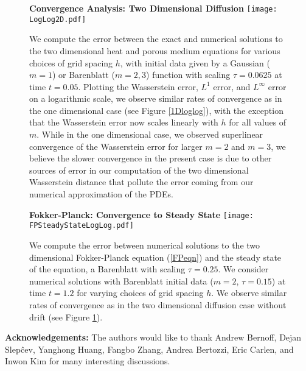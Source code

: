 \documentclass[11pt,leqno]{amsart}
\theoremstyle{definition}
\begin{document}
\begin{figure}[!ht]
\centering
\textbf{Convergence Analysis: Two Dimensional Diffusion}
\hspace*{-1.2cm}
\texttt{[image: LogLog2D.pdf]}
	\caption{We compute the error between the exact and numerical solutions to the two dimensional heat and porous medium equations  for various choices of grid spacing $h$, with initial data given by a Gaussian ($m=1$) or Barenblatt ($m=2, 3$) function with scaling $\tau = 0.0625$ at time $t = 0.05$. Plotting the Wasserstein error, $L^1$ error, and $L^\infty$ error on a logarithmic scale, we observe similar rates of convergence as in the one dimensional case (see Figure \ref{1Dloglog}), with the exception that the Wasserstein error now scales linearly with $h$ for all values of $m$. While in the one dimensional case, we observed superlinear convergence of the Wasserstein error for larger $m =2$ and $m=3$, we believe the slower convergence in the present case is due to other sources of error in our computation of the two dimensional Wasserstein distance that pollute the error coming from our numerical approximation of the PDEs. } \label{2Dloglog}
\end{figure}


\begin{figure}[!ht]
\centering
\textbf{Fokker-Planck: Convergence to Steady State}
\hspace*{-1.2cm}
\texttt{[image: FPSteadyStateLogLog.pdf]}
	\caption{We compute the error between numerical solutions to the two dimensional Fokker-Planck equation  (\ref{FPeqn}) and the steady state of the equation, a Barenblatt with scaling $\tau = 0.25$. We consider numerical solutions with Barenblatt initial data ($m=2$, $\tau = 0.15$) at time $t = 1.2$ for varying choices of grid spacing $h$. We observe similar rates of convergence as in the two dimensional diffusion case without drift (see Figure \ref{2Dloglog}).}
\end{figure}


\textbf{Acknowledgements:} The authors would like to thank Andrew Bernoff, Dejan Slep\^cev, Yanghong Huang, Fangbo Zhang, Andrea Bertozzi, Eric Carlen, and Inwon Kim for many interesting discussions.
\end{document}
